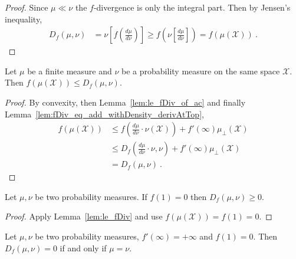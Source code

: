 \begin{proof}\leanok
Since $\mu \ll \nu$ the $f$-divergence is only the integral part. Then by Jensen's inequality,
\begin{align*}
D_f(\mu, \nu)
&= \nu\left[ f\left( \frac{d\mu}{d\nu} \right) \right]
\ge f\left( \nu\left[\frac{d\mu}{d\nu} \right] \right)
= f(\mu(\mathcal X))
\: .
\end{align*}

\end{proof}

\begin{lemma}
  \label{lem:le_fDiv}
  \leanok
  Let $\mu$ be a finite measure and $\nu$ be a probability measure on the same space $\mathcal X$. Then $f(\mu(\mathcal X)) \le D_f(\mu, \nu)$.
\end{lemma}

\begin{proof}\leanok
{}
By convexity, then Lemma~\ref{lem:le_fDiv_of_ac} and finally Lemma~\ref{lem:fDiv_eq_add_withDensity_derivAtTop},
\begin{align*}
f(\mu(\mathcal X))
&\le f(\frac{d\mu}{d\nu}\cdot \nu (\mathcal X)) + f'(\infty)\mu_{\perp}(\mathcal X)
\\
&\le D_f(\frac{d\mu}{d\nu}\cdot \nu , \nu) + f'(\infty)\mu_{\perp}(\mathcal X)
\\
&= D_f(\mu, \nu)
\: .
\end{align*}
\end{proof}

\begin{lemma}
  \label{lem:fDiv_nonneg}
  \leanok
  Let $\mu, \nu$ be two probability measures. If $f(1) = 0$ then $D_f(\mu, \nu) \ge 0$.
\end{lemma}

\begin{proof}\leanok
{}
Apply Lemma~\ref{lem:le_fDiv} and use $f(\mu(\mathcal X)) = f(1) = 0$.
\end{proof}

\begin{lemma}
  \label{lem:fDiv_eq_zero_iff}
  \leanok
  Let $\mu, \nu$ be two probability measures, $f'(\infty) = + \infty$ and $f(1) = 0$. Then $D_f(\mu, \nu) = 0$ if and only if $\mu = \nu$.
\end{lemma}

